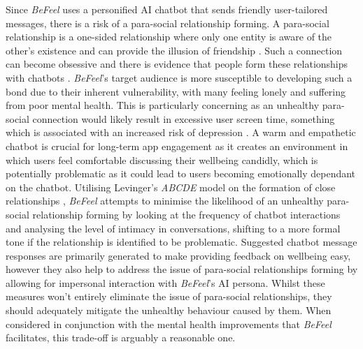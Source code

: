 \documentclass[acmsmall, screen, nonacm, 9pt, a4paper,top=2cm,bottom=2cm,left=1cm,right=1cm, marginparwidth=1cm]{acmart}
\begin{document}
Since \emph{BeFeel} uses a personified AI chatbot that sends friendly user-tailored messages, there is a risk of a para-social relationship forming. A para-social relationship is a one-sided relationship where only one entity is aware of the other’s existence and can provide the illusion of friendship \cite{Horton2016MassInteraction}. Such a connection can become obsessive and there is evidence that people form these relationships with chatbots \cite{TimeWhyTime}. \emph{BeFeel}’s target audience is more susceptible to developing such a bond due to their inherent vulnerability, with many feeling lonely and suffering from poor mental health. This is particularly concerning as an unhealthy para-social connection would likely result in excessive user screen time, something which is associated with an increased risk of depression \cite{Pandya2021SocialEvidence}. A warm and empathetic chatbot is crucial for long-term app engagement as it creates an environment in which users feel comfortable discussing their wellbeing candidly, which is potentially problematic as it could lead to users becoming emotionally dependant on the chatbot. Utilising Levinger’s \emph{ABCDE} model on the formation of close relationships \cite{Levinger1980TowardRelationships}, \emph{BeFeel} attempts to minimise the likelihood of an unhealthy para-social relationship forming by looking at the frequency of chatbot interactions and analysing the level of intimacy in conversations, shifting to a more formal tone if the relationship is identified to be problematic. Suggested chatbot message responses are primarily generated to make providing feedback on wellbeing easy, however they also help to address the issue of para-social relationships forming by allowing for impersonal interaction with \emph{BeFeel}’s AI persona. Whilst these measures won’t entirely eliminate the issue of para-social relationships, they should adequately mitigate the unhealthy behaviour caused by them. When considered in conjunction with the mental health improvements that \emph{BeFeel} facilitates, this trade-off is arguably a reasonable one.
\end{document}
